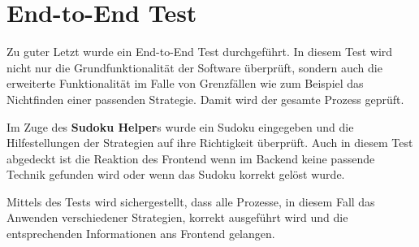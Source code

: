 \section{End-to-End Test}
Zu guter Letzt wurde ein End-to-End Test durchgeführt. In diesem Test wird nicht nur die Grundfunktionalität der Software überprüft, sondern auch die erweiterte Funktionalität im Falle von Grenzfällen wie zum Beispiel das Nichtfinden einer passenden Strategie. Damit wird der gesamte Prozess geprüft. 

Im Zuge des \textbf{Sudoku Helper}s wurde ein Sudoku eingegeben und die Hilfestellungen der Strategien auf ihre Richtigkeit überprüft. Auch in diesem Test abgedeckt ist die Reaktion des Frontend wenn im Backend keine passende Technik gefunden wird oder wenn das Sudoku korrekt gelöst wurde.

Mittels des Tests wird sichergestellt, dass alle Prozesse, in diesem Fall das Anwenden verschiedener Strategien, korrekt ausgeführt wird und die entsprechenden Informationen ans Frontend gelangen.